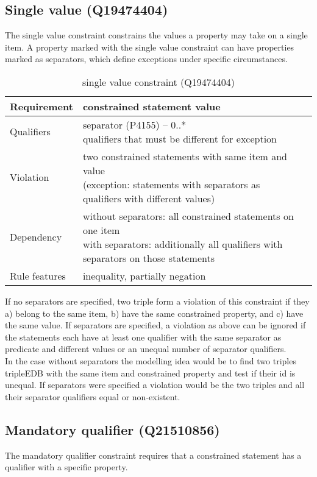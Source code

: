 \documentclass[hyperref,bachelorofscience,fleqn]{cgvpub}
\begin{document}
\subsection{Single value (Q19474404)}
The single value constraint constrains the values a property may take on a single item. A property marked with the single value constraint can have properties marked as separators, which define exceptions under specific circumstances.
\begin{table}[H]
\caption{single value constraint (Q19474404)}
\begin{tabularx}{\textwidth}{ ll X}
\hline
Requirement & constrained statement value \\
\hline
Qualifiers & \makecell{separator (P4155) -- 0..* \\ qualifiers that must be different for exception} \\
\hline
Violation & \makecell{two constrained statements with same item and value \\ (exception: statements with separators as qualifiers with different values)} \\
\hline
Dependency & \makecell{without separators: all constrained statements on one item \\ with separators: additionally all qualifiers with separators on those statements }\\
\hline
Rule features & inequality, partially negation \\
\hline
\end{tabularx}
\end{table}

If no separators are specified, two triple form a violation of this constraint if they a) belong to the same item, b) have the same constrained property, and c) have the same value.
If separators are specified, a violation as above can be ignored if the statements each have at least one qualifier with the same separator as predicate and different values or an unequal number of separator qualifiers.\\
In the case without separators the modelling idea would be to find two triples tripleEDB with the same item and constrained property and test if their id is unequal. If separators were specified a violation would be the two triples and all their separator qualifiers equal or non-existent.

\subsection{Mandatory qualifier (Q21510856)}
The mandatory qualifier constraint requires that a constrained statement has a qualifier with a specific property.
\end{document}
